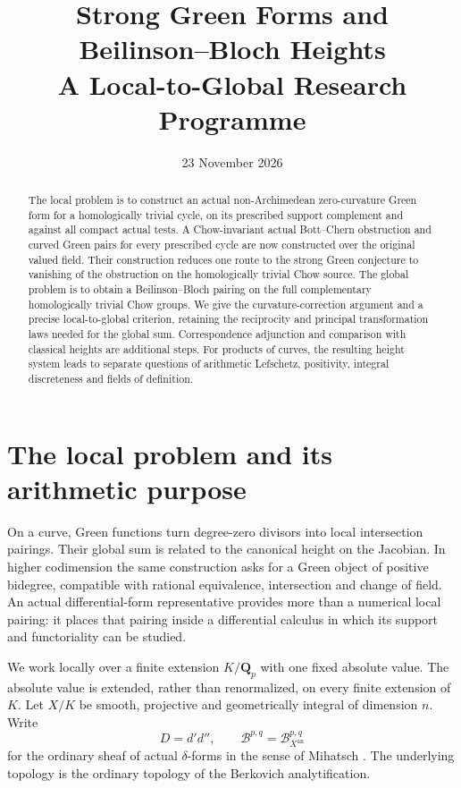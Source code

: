 \documentclass[11pt]{article}
\title{Strong Green Forms and Beilinson--Bloch Heights\\A Local-to-Global Research Programme}
\author{}
\date{23 November 2026}
\theoremstyle{definition}
\numberwithin{equation}{section}
\newcommand{\an}{\mathrm{an}}
\newcommand{\B}{\mathcal B}
\newcommand{\Q}{\mathbf Q}
\begin{document}
\maketitle
\begin{abstract}
The local problem is to construct an actual non-Archimedean zero-curvature Green form for a homologically trivial cycle, on its prescribed support complement and against all compact actual tests. A Chow-invariant actual Bott--Chern obstruction and curved Green pairs for every prescribed cycle are now constructed over the original valued field. Their construction reduces one route to the strong Green conjecture to vanishing of the obstruction on the homologically trivial Chow source. The global problem is to obtain a Beilinson--Bloch pairing on the full complementary homologically trivial Chow groups. We give the curvature-correction argument and a precise local-to-global criterion, retaining the reciprocity and principal transformation laws needed for the global sum. Correspondence adjunction and comparison with classical heights are additional steps. For products of curves, the resulting height system leads to separate questions of arithmetic Lefschetz, positivity, integral discreteness and fields of definition.
\end{abstract}

\tableofcontents

\section{The local problem and its arithmetic purpose}\label{sec:purpose}

On a curve, Green functions turn degree-zero divisors into local intersection pairings. Their global sum is related to the canonical height on the Jacobian. In higher codimension the same construction asks for a Green object of positive bidegree, compatible with rational equivalence, intersection and change of field. An actual differential-form representative provides more than a numerical local pairing: it places that pairing inside a differential calculus in which its support and functoriality can be studied.

We work locally over a finite extension $K/\Q_p$ with one fixed absolute value. The absolute value is extended, rather than renormalized, on every finite extension of $K$. Let $X/K$ be smooth, projective and geometrically integral of dimension $n$. Write
\[
 D=d'd'',\qquad \B^{p,q}=\B^{p,q}_{X^{\an}}
\]
for the ordinary sheaf of actual $\delta$-forms in the sense of Mihatsch \cite{M}. The underlying topology is the ordinary topology of the Berkovich analytification.
\end{document}
